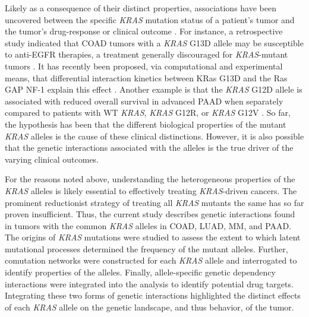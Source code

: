 \documentclass[english, 10pt, letterpaper]{article}
\newcommand{\KRAS}{\emph{KRAS}}
\newcommand{\kras}{KRas}
\begin{document}
Likely as a consequence of their distinct properties, associations have been uncovered between the specific \KRAS{} mutation status of a patient's tumor and the tumor's drug-response or clinical outcome \cite{Haigis2017, Li2018}.
For instance, a retrospective study indicated that COAD tumors with a \KRAS{} G13D allele may be susceptible to anti-EGFR therapies, a treatment generally discouraged for \KRAS{}-mutant tumors \cite{DeRoock2010}. 
It has recently been proposed, via computational and experimental means, that differential interaction kinetics between \kras{} G13D and the Ras GAP NF-1 explain this effect \cite{McFall2019, Rabara2019}.
Another example is that the \KRAS{} G12D allele is associated with reduced overall survival in advanced PAAD when separately compared to patients with WT \KRAS{}, \KRAS{} G12R, or \KRAS{} G12V \cite{Bournet2016}.
So far, the hypothesis has been that the different biological properties of the mutant \KRAS{} alleles is the cause of these clinical distinctions.
However, it is also possible that the genetic interactions associated with the alleles is the true driver of the varying clinical outcomes.


For the reasons noted above, understanding the heterogeneous properties of the \KRAS{} alleles is likely essential to effectively treating \KRAS{}-driven cancers.
The prominent reductionist strategy of treating all \KRAS{} mutants the same has so far proven insufficient.
Thus, the current study describes genetic interactions found in tumors with the common \KRAS{} alleles in COAD, LUAD, MM, and PAAD.
The origins of \KRAS{} mutations were studied to assess the extent to which latent mutational processes determined the frequency of the mutant alleles.
Further, comutation networks were constructed for each \KRAS{} allele and interrogated to identify properties of the alleles.
Finally, allele-specific genetic dependency interactions were integrated into the analysis to identify potential drug targets.
Integrating these two forms of genetic interactions highlighted the distinct effects of each \KRAS{} allele on the genetic landscape, and thus behavior, of the tumor.
\end{document}
